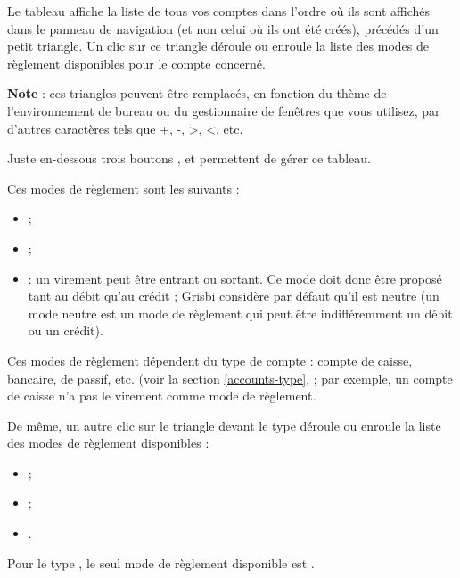 Le tableau affiche la liste de tous vos comptes dans l'ordre où ils sont affichés dans le panneau de navigation (et non celui où ils ont été créés), précédés d'un petit triangle. Un clic sur ce triangle déroule ou enroule la liste des modes de règlement disponibles pour le compte concerné.

\textbf{Note} : ces triangles peuvent être remplacés, en fonction du thème de l'environnement de bureau ou du gestionnaire de fenêtres que vous utilisez, par d'autres caractères tels que +, -, >, <, etc.


Juste en-dessous trois boutons ,  et   permettent de gérer ce tableau.






Ces modes de règlement sont les suivants : 

\begin{itemize}
	\item {} ;
	\item {} ;
	\item {} : un virement peut être entrant ou sortant. Ce mode doit donc être proposé tant au débit qu'au crédit ; Grisbi considère par défaut qu'il est neutre (un mode neutre est un mode de règlement qui peut être indifféremment un débit ou un crédit).
\end{itemize}

Ces modes de règlement dépendent du type de compte : compte de caisse, bancaire, de passif, etc.
(voir la section \vref{accounts-type},  ; par exemple, un compte de caisse n'a pas le virement comme mode de règlement.

De même, un autre clic sur le triangle devant le type  déroule ou enroule la liste des modes de règlement disponibles :

\begin{itemize}
	\item {} ;
	\item {} ;
	\item {}.
\end{itemize}

Pour le type , le seul mode de règlement disponible est .

\ifIllustration
\else
\fi




